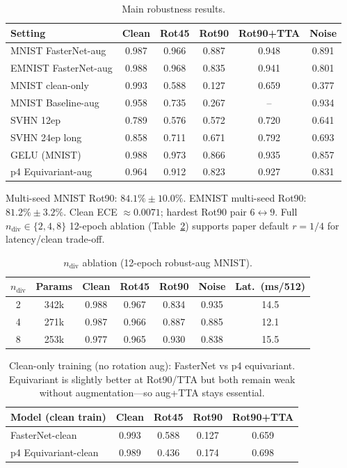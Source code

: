 \documentclass[11pt,a4paper]{article}
\begin{document}
\begin{table}[H]
\centering
\small
\caption{Main robustness results.}
\label{tab:main}
\begin{tabular}{lccccc}
\toprule
Setting & Clean & Rot45 & Rot90 & Rot90+TTA & Noise \\
\midrule
MNIST FasterNet-aug & 0.987 & 0.966 & 0.887 & 0.948 & 0.891 \\
EMNIST FasterNet-aug & 0.988 & 0.968 & 0.835 & 0.941 & 0.801 \\
MNIST clean-only & 0.993 & 0.588 & 0.127 & 0.659 & 0.377 \\
MNIST Baseline-aug & 0.958 & 0.735 & 0.267 & -- & 0.934 \\
SVHN 12ep & 0.789 & 0.576 & 0.572 & 0.720 & 0.641 \\
SVHN 24ep long & 0.858 & 0.711 & 0.671 & 0.792 & 0.693 \\
GELU (MNIST) & 0.988 & 0.973 & 0.866 & 0.935 & 0.857 \\
p4 Equivariant-aug & 0.964 & 0.912 & 0.823 & 0.927 & 0.831 \\
\bottomrule
\end{tabular}
\end{table}

{\small
Multi-seed MNIST Rot90: $84.1\%\pm 10.0\%$. EMNIST multi-seed Rot90: $81.2\%\pm 3.2\%$. Clean ECE $\approx 0.0071$; hardest Rot90 pair $6\leftrightarrow 9$. Full $n_{\mathrm{div}}\!\in\!\{2,4,8\}$ 12-epoch ablation (Table~\ref{tab:ndiv}) supports paper default $r{=}1/4$ for latency/clean trade-off.
}

\begin{table}[H]
\centering
\small
\caption{$n_{\mathrm{div}}$ ablation (12-epoch robust-aug MNIST).}
\label{tab:ndiv}
\begin{tabular}{ccccccc}
\toprule
$n_{\mathrm{div}}$ & Params & Clean & Rot45 & Rot90 & Noise & Lat.\ (ms/512) \\
\midrule
2 & 342k & 0.988 & 0.967 & 0.834 & 0.935 & 14.5 \\
4 & 271k & 0.987 & 0.966 & 0.887 & 0.885 & 12.1 \\
8 & 253k & 0.977 & 0.965 & 0.930 & 0.838 & 15.5 \\
\bottomrule
\end{tabular}
\end{table}

\begin{table}[H]
\centering
\small
\caption{Clean-only training (no rotation aug): FasterNet vs p4 equivariant. Equivariant is slightly better at Rot90/TTA but both remain weak without augmentation---so aug+TTA stays essential.}
\label{tab:clean_eq}
\begin{tabular}{lcccc}
\toprule
Model (clean train) & Clean & Rot45 & Rot90 & Rot90+TTA \\
\midrule
FasterNet-clean & 0.993 & 0.588 & 0.127 & 0.659 \\
p4 Equivariant-clean & 0.989 & 0.436 & 0.174 & 0.698 \\
\bottomrule
\end{tabular}
\end{table}
\end{document}
